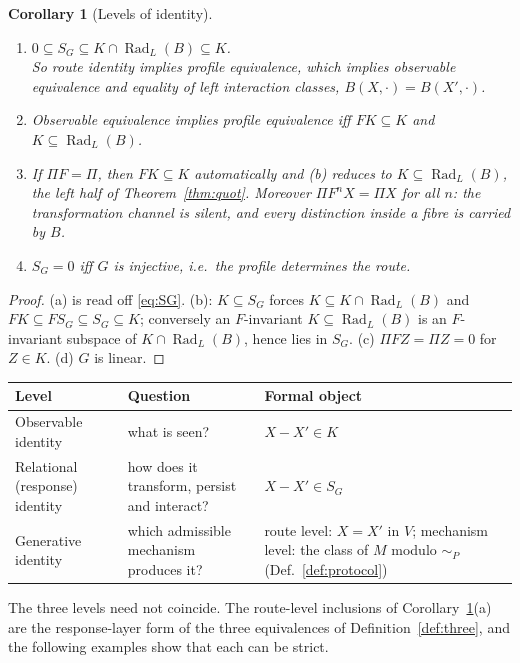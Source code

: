 \documentclass[11pt,a4paper]{article}
\newcommand{\Rad}{\operatorname{Rad}}
\theoremstyle{plain}
\newtheorem{corollary}[theorem]{Corollary}
\theoremstyle{definition}
\begin{document}
\begin{corollary}[Levels of identity]\label{cor:levels}
\begin{enumerate}[label=(\alph*)]
\item $0\subseteq S_G\subseteq K\cap\Rad_L(B)\subseteq K$.\\
So route identity implies profile equivalence, which implies observable equivalence and equality of left interaction classes, $B(X,\cdot)=B(X',\cdot)$.
\item Observable equivalence implies profile equivalence iff $FK\subseteq K$ and $K\subseteq\Rad_L(B)$.
\item If $\Pi F=\Pi$, then $FK\subseteq K$ automatically and (b) reduces to $K\subseteq\Rad_L(B)$, the left half of Theorem~\ref{thm:quot}. Moreover $\Pi F^nX=\Pi X$ for all $n$: the transformation channel is silent, and every distinction inside a fibre is carried by $B$.
\item $S_G=0$ iff $G$ is injective, i.e.\ the profile determines the route.
\end{enumerate}
\end{corollary}
\begin{proof}
(a) is read off \eqref{eq:SG}. (b): $K\subseteq S_G$ forces $K\subseteq K\cap\Rad_L(B)$ and $FK\subseteq FS_G\subseteq S_G\subseteq K$; conversely an $F$-invariant $K\subseteq\Rad_L(B)$ is an $F$-invariant subspace of $K\cap\Rad_L(B)$, hence lies in $S_G$. (c) $\Pi FZ=\Pi Z=0$ for $Z\in K$. (d) $G$ is linear.
\end{proof}

\begin{center}\small
\begin{tabularx}{\textwidth}{@{}l>{\raggedright\arraybackslash}X>{\raggedright\arraybackslash}X@{}}
\toprule
Level & Question & Formal object\\
\midrule
Observable identity & what is seen? & $X-X'\in K$\\
Relational (response) identity & how does it transform, persist and interact? & $X-X'\in S_G$\\
Generative identity & which admissible mechanism produces it? & route level: $X=X'$ in $V$; mechanism level: the class of $M$ modulo $\sim_P$ (Def.~\ref{def:protocol})\\
\bottomrule
\end{tabularx}
\end{center}
The three levels need not coincide. The route-level inclusions of Corollary~\ref{cor:levels}(a) are the response-layer form of the three equivalences of Definition~\ref{def:three}, and the following examples show that each can be strict.
\end{document}
